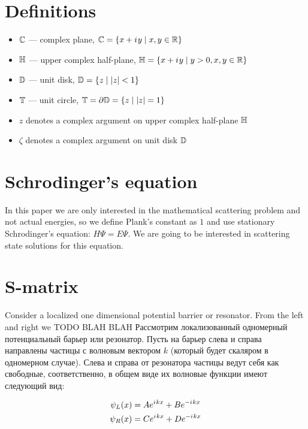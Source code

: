 \section{Definitions}
\begin{itemize}
\item $\mathbb{C}$ — complex plane, $\mathbb{C} = \{ x + {i\mkern1mu} y \mid x, y \in \mathbb{R} \}$ 
\item $\mathbb{H}$ — upper complex half-plane, $\mathbb{H} = \{ x + {i\mkern1mu} y \mid y > 0, x, y \in \mathbb{R} \}$
\item $\mathbb{D}$ — unit disk, $\mathbb{D} = \{ z \mid \abs{z} < 1 \}$
\item $\mathbb{T}$ — unit circle, $\mathbb{T} = \partial \mathbb{D} =  \{z \mid \abs{z} = 1 \}$
\item $z$ denotes a complex argument on upper complex half-plane $\mathbb{H}$
\item $\zeta$ denotes a complex argument on unit disk $\mathbb{D}$
\end{itemize}

\section{Schrodinger's equation}
In this paper we are only interested in the mathematical scattering problem and not actual energies, so we define Plank's constant as $1$ and use stationary Schrodinger's equation: $H \Psi = E \Psi$. We are going to be interested in scattering state solutions for this equation.

\section{S-matrix}\label{sec:smatrix}
Consider a localized one dimensional potential barrier or resonator. From the left and right we TODO BLAH BLAH
Рассмотрим локализованный одномерный потенциальный барьер или резонатор. Пусть на барьер слева и справа направлены частицы с волновым вектором $k$ (который будет скаляром в одномерном случае). Слева и справа от резонатора частицы ведут себя как свободные, соответственно, в общем виде их волновые функции имеют следующий вид:

\begin{equation}\label{eq:wlwl}
\begin{aligned}
   \psi_L(x) &= A \eexp{\iu k x} + B \eexp{-\iu k x}
\\ \psi_R(x) &= C \eexp{\iu k x} + D \eexp{-\iu k x}
\end{aligned}
\end{equation}

